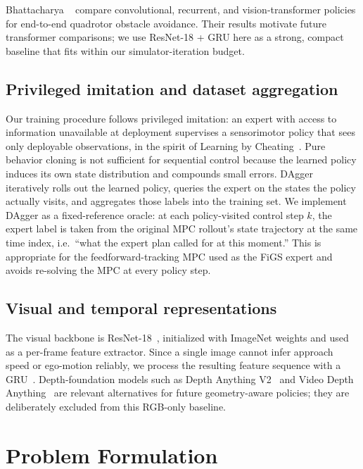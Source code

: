 \documentclass[10pt,twocolumn,letterpaper]{article}
\begin{document}
Bhattacharya \etal~\cite{bhattacharya2024vision} compare convolutional, recurrent, and vision-transformer policies for end-to-end quadrotor obstacle avoidance. Their results motivate future transformer comparisons; we use ResNet-18 + GRU here as a strong, compact baseline that fits within our simulator-iteration budget.

\subsection{Privileged imitation and dataset aggregation}

Our training procedure follows privileged imitation: an expert with access to information unavailable at deployment supervises a sensorimotor policy that sees only deployable observations, in the spirit of Learning by Cheating~\cite{chen2020learning}. Pure behavior cloning is not sufficient for sequential control because the learned policy induces its own state distribution and compounds small errors. DAgger~\cite{ross2011reduction} iteratively rolls out the learned policy, queries the expert on the states the policy actually visits, and aggregates those labels into the training set. We implement DAgger as a fixed-reference oracle: at each policy-visited control step $k$, the expert label is taken from the original MPC rollout's state trajectory at the same time index, i.e.~``what the expert plan called for at this moment.'' This is appropriate for the feedforward-tracking MPC used as the FiGS expert and avoids re-solving the MPC at every policy step.

\subsection{Visual and temporal representations}

The visual backbone is ResNet-18~\cite{he2016deep}, initialized with ImageNet weights and used as a per-frame feature extractor. Since a single image cannot infer approach speed or ego-motion reliably, we process the resulting feature sequence with a GRU~\cite{cho2014learning}. Depth-foundation models such as Depth Anything V2~\cite{yang2024depthanythingv2} and Video Depth Anything~\cite{chen2025videodepthanything} are relevant alternatives for future geometry-aware policies; they are deliberately excluded from this RGB-only baseline.

\section{Problem Formulation}
\label{sec:formulation}
\end{document}
